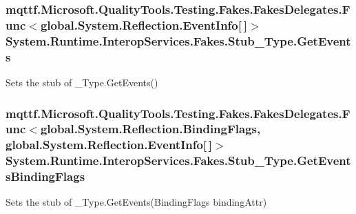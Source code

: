 \hypertarget{class_system_1_1_runtime_1_1_interop_services_1_1_fakes_1_1_stub___type_a82f4b808dd6826e789d42a4be8950df1}{
\subsubsection[{Get\-Events}]{\setlength{\rightskip}{0pt plus 5cm}mqttf.\-Microsoft.\-Quality\-Tools.\-Testing.\-Fakes.\-Fakes\-Delegates.\-Func$<$global.\-System.\-Reflection.\-Event\-Info\mbox{[}$\,$\mbox{]}$>$ System.\-Runtime.\-Interop\-Services.\-Fakes.\-Stub\-\_\-\-Type.\-Get\-Events}}\label{class_system_1_1_runtime_1_1_interop_services_1_1_fakes_1_1_stub___type_a82f4b808dd6826e789d42a4be8950df1}


Sets the stub of \-\_\-\-Type.\-Get\-Events()

\hypertarget{class_system_1_1_runtime_1_1_interop_services_1_1_fakes_1_1_stub___type_a9547d09d38ecab906977c0bf627da4c0}{
\subsubsection[{Get\-Events\-Binding\-Flags}]{\setlength{\rightskip}{0pt plus 5cm}mqttf.\-Microsoft.\-Quality\-Tools.\-Testing.\-Fakes.\-Fakes\-Delegates.\-Func$<$global.\-System.\-Reflection.\-Binding\-Flags, global.\-System.\-Reflection.\-Event\-Info\mbox{[}$\,$\mbox{]}$>$ System.\-Runtime.\-Interop\-Services.\-Fakes.\-Stub\-\_\-\-Type.\-Get\-Events\-Binding\-Flags}}\label{class_system_1_1_runtime_1_1_interop_services_1_1_fakes_1_1_stub___type_a9547d09d38ecab906977c0bf627da4c0}


Sets the stub of \-\_\-\-Type.\-Get\-Events(\-Binding\-Flags binding\-Attr)

